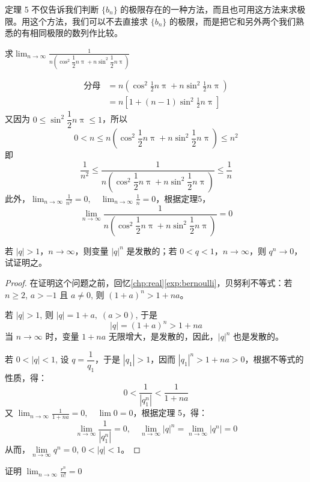 \medskip
定理 5 不仅告诉我们判断 $\{b_n\}$ 的极限存在的一种方法，而且也可用这方法来求极限。用这个方法，我们可以不去直接求 $\{b_n\}$ 的极限，而是把它和另外两个我们熟悉的有相同极限的数列作比较。

\begin{example}
    求$\displaystyle \lim_{n\to\infty}\frac{1}{n\left(\cos^2\dfrac{1}{2}n\uppi+n\sin^2\dfrac{1}{2}n\uppi\right)}$
\end{example}

\begin{solution}
\[\begin{split}
    \text{分母}&=n\left(\cos^2\frac{1}{2}n\uppi+n\sin^2\frac{1}{2}n\uppi\right)\\
    &=n\left[1+(n-1)\sin^2\frac{1}{2}n\uppi\right]
\end{split}\]
又因为 $0\leqslant \sin^2\dfrac{1}{2}n\uppi\leqslant 1$，所以
\[0<n\leqslant n\left(\cos^2\frac{1}{2}n\uppi+n\sin^2\frac{1}{2}n\uppi\right)\leqslant n^2\]
即
\[\frac{1}{n^2}\leqslant \frac{1}{n\left(\cos^2\dfrac{1}{2}n\uppi+n\sin^2\dfrac{1}{2}n\uppi\right)}\leqslant \frac{1}{n}\]
此外，$\displaystyle\lim_{n\to\infty}\frac{1}{n^2}=0,\quad \lim_{n\to\infty}\frac{1}{n}=0$，根据定理5，
\[\lim_{n\to\infty}\frac{1}{n\left(\cos^2\dfrac{1}{2}n\uppi+n\sin^2\dfrac{1}{2}n\uppi\right)}=0\]
\end{solution}

\begin{example}
  若 $|q|>1$，$n\to\infty$，则变量 $|q|^n$ 是发散的；若 $0<q<1$，$n\to\infty$，则 $q^n\to 0$，试证明之。
\end{example}

\begin{proof}
在证明这个问题之前，回忆\cref{chp:real}\cref{exp:bernoulli}，贝努利不等式：若 $n\geqslant 2$, $a>-1$ 且 $a\ne 0$, 则 $(1+a)^n>1+na$。

若 $|q|>1$, 则 $|q|=1+a,\; (a>0)$, 于是
\[|q|=(1+a)^n>1+na\]
当 $n\to\infty$ 时，变量 $1+na$ 无限增大，是发散的，因此，$|q|^n$ 也是发散的。

若 $0<|q|<1$, 设 $q=\dfrac{1}{q_1}$，于是 $|q_1|>1$，因而 $|q_1|^n>1+na>0$，根据不等式的性质，得：
\[0<\frac{1}{|q^n_1|}<\frac{1}{1+na}\]
又 $\displaystyle \lim_{n\to\infty}\frac{1}{1+na}=0,\quad \lim 0=0$，根据定理 5，得：
\[\lim_{n\to\infty}\frac{1}{|q^n_1|}=0,\quad \lim_{n\to\infty}|q|^n=\lim_{n\to\infty}|q^n|=0\]
从而，$\lim\limits_{n\to\infty}q^n=0$, $0<|q|<1$。
\end{proof}

\begin{example}
  证明 $\displaystyle \lim_{n\to\infty}\frac{r^n}{n!}=0$
\end{example}

